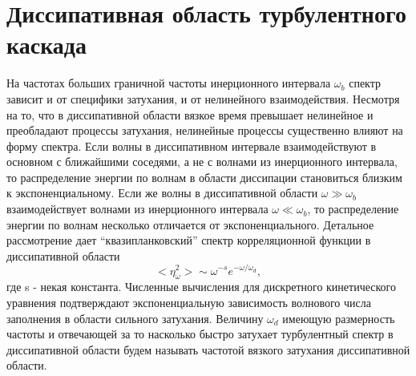 \section{Диссипативная область турбулентного каскада}%

На частотах больших граничной частоты инерционного интервала $\omega_b$ спектр зависит и от специфики затухания, и от нелинейного взаимодействия. Несмотря на то, что в диссипативной области вязкое время превышает нелинейное и преобладают процессы затухания, нелинейные процессы существенно влияют на форму спектра. Если волны в диссипативном интервале взаимодействуют в основном с ближайшими соседями, а не с волнами из инерционного интервала, то распределение энергии по волнам в области диссипации становиться близким к экспоненциальному.
Если же волны в диссипативной области $\omega \gg \omega_b$ взаимодействует волнами из инерционного интервала $\omega \ll \omega_b$, то распределение энергии по волнам несколько отличается от экспоненциального. Детальное рассмотрение дает “квазипланковский” спектр корреляционной функции в диссипативной области  \cite{Ryzhenkova1990}
\begin{equation}
<\eta_\omega^2> \sim \omega^{-s} e^{-\omega/\omega_d},
\end{equation}			
где s - некая константа. Численные вычисления для дискретного кинетического уравнения \cite{Ryzhenkova1990} подтверждают экспоненциальную зависимость волнового числа заполнения в области сильного затухания. Величину $\omega_d$ имеющую размерность частоты и отвечающей за то насколько быстро затухает турбулентный спектр в диссипативной области будем называть частотой вязкого затухания диссипативной области.
	

%
%


